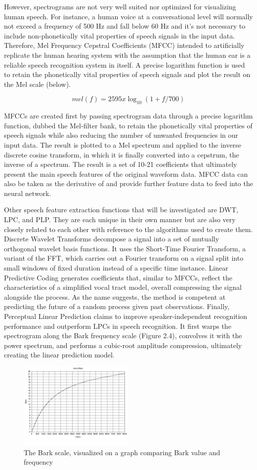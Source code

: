 However, spectrograms are not very well suited nor optimized for visualizing human speech. For instance, a human voice at a conversational level will normally not exceed a frequency of 500 Hz and fall below 60 Hz and it’s not necessary to include non-phonetically vital properties of speech signals in the input data. Therefore, Mel Frequency Cepstral Coefficients (MFCC) intended to artificially replicate the human hearing system with the assumption that the human ear is a reliable speech recognition system in itself. A precise logarithm function is used to retain the phonetically vital properties of speech signals and plot the result on the Mel scale (below).

\[mel(f) = 2595 x \log_10(1+ f/700)\]

MFCCs are created first by passing spectrogram data through a precise logarithm function, dubbed the Mel-filter bank, to retain the phonetically vital properties of speech signals while also reducing the number of unwanted frequencies in our input data. The result is plotted to a Mel spectrum and applied to the inverse discrete cosine transform, in which it is finally converted into a cepstrum, the inverse of a spectrum. The result is a set of 10-21 coefficients that ultimately present the main speech features of the original waveform data. MFCC data can also be taken as the derivative of and provide further feature data to feed into the neural network.
\newline\par
Other speech feature extraction functions that will be investigated are DWT, LPC, and PLP. They are each unique in their own manner but are also very closely related to each other with reference to the algorithms used to create them. Discrete Wavelet Transforms decompose a signal into a set of mutually orthogonal wavelet basis functions. It uses the Short-Time Fourier Transform, a variant of the FFT, which carries out a Fourier transform on a signal split into small windows of fixed duration instead of a specific time instance. Linear Predictive Coding generates coefficients that, similar to MFCCs, reflect the characteristics of a simplified vocal tract model, overall compressing the signal alongside the process. As the name suggests, the method is competent at predicting the future of a random process given past observations. Finally, Perceptual Linear Prediction claims to improve speaker-independent recognition performance and outperform LPCs in speech recognition. It first warps the spectrogram along the Bark frequency scale (Figure 2.4), convolves it with the power spectrum, and performs a cubic-root amplitude compression, ultimately creating the linear prediction model.

\begin{figure}[th]
    \centering
    \includegraphics[width=0.5\textwidth]{Figures/barkscale.png}
    \decoRule
    \caption[Bark Scale]{The Bark scale, visualized on a graph comparing Bark value and frequency}
    \label{fig:BarkScale}
\end{figure}